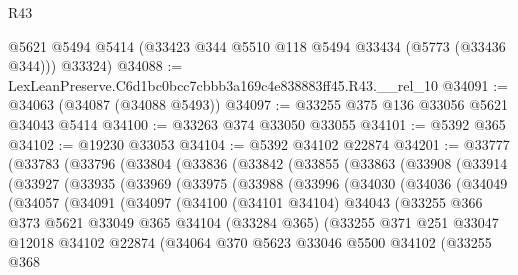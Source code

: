 \begin{lexlean}{R43}
\begin{coremodule}
      @5621
      @5494
      @5414
      (@33423 @344 @5510 @118 @5494 @33434 (@5773 (@33436 @344)))
      @33324)
@34088 := LexLeanPreserve.C6d1bc0bcc7cbbb3a169c4e838883ff45.R43.__rel_10
@34091 := @34063 (@34087 (@34088 @5493))
@34097 := @33255 @375 @136 @33056 @5621 @34043 @5414
@34100 := @33263 @374 @33050 @33055
@34101 := @5392 @365
@34102 := @19230 @33053
@34104 := @5392 @34102 @22874
@34201 := @33777
    (@33783
      (@33796
        (@33804
          (@33836
            (@33842
              (@33855
                (@33863
                  (@33908
                    (@33914
                      (@33927
                        (@33935
                          (@33969
                            (@33975
                              (@33988
                                (@33996
                                  (@34030
                                    (@34036
                                      (@34049
                                        (@34057
                                          (@34091
                                            (@34097
                                              (@34100
                                                (@34101 @34104)
                                                @34043
                                                (@33255
                                                  @366
                                                  @373
                                                  @5621
                                                  @33049
                                                  @365
                                                  @34104
                                                  (@33284 @365)
                                                  (@33255
                                                    @371
                                                    @251
                                                    @33047
                                                    @12018
                                                    @34102
                                                    @22874
                                                    (@34064
                                                      @370
                                                      @5623
                                                      @33046
                                                      @5500
                                                      @34102
                                                      (@33255
                                                        @368

\end{coremodule}
\end{lexlean}
